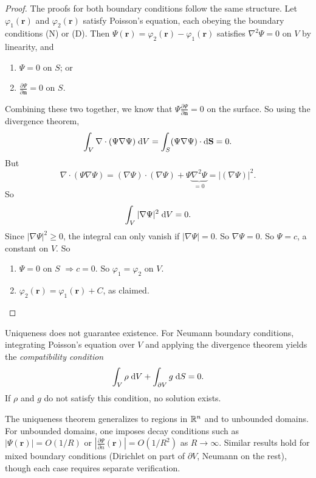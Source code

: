 \documentclass[a4paper]{article}
\begin{document}
\begin{proof}
  The proofs for both boundary conditions follow the same structure.
  Let $\varphi_1(\mathbf{r})$ and $\varphi_2(\mathbf{r})$ satisfy Poisson's equation, each obeying the boundary conditions (N) or (D). Then $\Psi(\mathbf{r}) = \varphi_2(\mathbf{r}) - \varphi_1(\mathbf{r})$ satisfies $\nabla^2\Psi = 0$ on $V$ by linearity, and
  \begin{enumerate}
    \item $\Psi = 0$ on $S$; or
    \item $\frac{\partial \Psi}{\partial \mathbf{n}} = 0$ on $S$.
  \end{enumerate}
  Combining these two together, we know that $\Psi\frac{\partial \Psi}{\partial \mathbf{n}} = 0$ on the surface. So using the divergence theorem,
  \[
    \int_V \nabla\cdot (\Psi\nabla \Psi) \;\mathrm{d} V = \int_S (\Psi\nabla\Psi)\cdot \mathrm{d} \mathbf{S} = 0.
  \]
  But
  \[
    \nabla\cdot(\Psi\nabla \Psi) = (\nabla\Psi)\cdot (\nabla\Psi) + \Psi\underbrace{\nabla^2\Psi}_{=0} = |(\nabla\Psi)|^2.
  \]
  So
  \[
    \int_V |\nabla \Psi|^2\;\mathrm{d} V = 0.
  \]
  Since $|\nabla\Psi|^2 \geq 0$, the integral can only vanish if $|\nabla \Psi| = 0$. So $\nabla\Psi = 0$. So $\Psi = c$, a constant on $V$. So
  \begin{enumerate}
    \item $\Psi = 0$ on $S$ $\Rightarrow c = 0$. So $\varphi_1 = \varphi_2$ on $V$.
    \item $\varphi_2(\mathbf{r}) = \varphi_1(\mathbf{r}) + C$, as claimed.\qedhere
  \end{enumerate}
\end{proof}

\begin{rmk}
  Uniqueness does not guarantee existence. For Neumann boundary conditions, integrating Poisson's equation over $V$ and applying the divergence theorem yields the \emph{compatibility condition}
  \[
    \int_V \rho \;\mathrm{d} V + \int_{\partial V} g\;\mathrm{d} S = 0.
  \]
  If $\rho$ and $g$ do not satisfy this condition, no solution exists.
\end{rmk}

\begin{rmk}[Extensions]
  The uniqueness theorem generalizes to regions in $\mathbb{R}^n$ and to unbounded domains. For unbounded domains, one imposes decay conditions such as $|\Psi(\mathbf{r})| = O(1/R)$ or $|\frac{\partial \Psi}{\partial n}(\mathbf{r})| = O(1/R^2)$ as $R \to \infty$. Similar results hold for mixed boundary conditions (Dirichlet on part of $\partial V$, Neumann on the rest), though each case requires separate verification.
\end{rmk}
\end{document}
